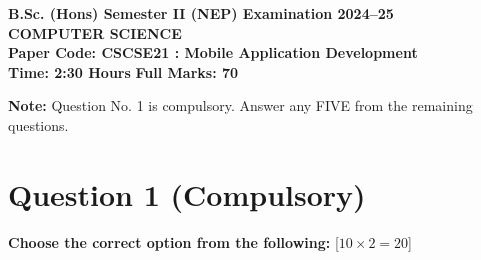 \documentclass[11pt,a4paper]{article}
\begin{document}
\begin{center}
    {\Large   \textbf{B.Sc. (Hons) Semester II (NEP) Examination 2024--25}}\\[4pt]
    {\large   \textbf{COMPUTER SCIENCE}}\\[4pt]
   \textbf{Paper Code: CSCSE21 : Mobile Application Development}\\[6pt]
   \textbf{Time: 2:30 Hours} \hfill   \textbf{Full Marks: 70}
\end{center}
\hr




\noindent   \textbf{Note:} Question No. 1 is compulsory. Answer any FIVE from the remaining questions.

\section*{Question 1 (Compulsory)}



\noindent   \textbf{Choose the correct option from the following:} \hfill [$10  \times 2 = 20$]
\end{document}
